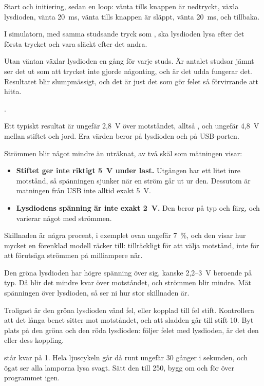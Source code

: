 Start och initiering, sedan en loop: vänta tills knappen är nedtryckt, växla lysdioden, vänta
20~ms, vänta tills knappen är släppt, vänta 20~ms, och tillbaka.

I simulatorn, med samma studsande tryck som , ska lysdioden lysa
efter det första trycket och vara släckt efter det andra.

Utan väntan växlar lysdioden en gång för varje studs. Är antalet studsar jämnt ser det ut som
att trycket inte gjorde någonting, och är det udda fungerar det. Resultatet blir slumpmässigt, och
det är just det som gör felet så förvirrande att hitta.

.

Ett typiskt resultat är ungefär 2,8~V över motståndet, alltså , och
ungefär 4,8~V mellan stiftet och jord. Era värden beror på lysdioden och på USB-porten.

Strömmen blir något mindre än uträknat, av två skäl som mätningen visar:
\begin{itemize}
  \item \textbf{Stiftet ger inte riktigt 5~V under last.} Utgången har ett litet inre motstånd, så
    spänningen sjunker när en ström går ut ur den. Dessutom är matningen från USB inte alltid
    exakt 5~V.
  \item \textbf{Lysdiodens spänning är inte exakt 2~V.} Den beror på typ och färg, och varierar
    något med strömmen.
\end{itemize}
Skillnaden är några procent, i exemplet ovan ungefär 7~\%, och den visar hur mycket en förenklad
modell räcker till: tillräckligt för att välja motstånd, inte för att förutsäga strömmen på
milliampere när.

Den gröna lysdioden har högre spänning över sig, kanske 2,2--3~V beroende på typ. Då blir det
mindre kvar över motståndet, och strömmen blir mindre. Mät spänningen över lysdioden, så ser ni hur
stor skillnaden är.

Troligast är den gröna lysdioden vänd fel, eller kopplad till fel stift. Kontrollera att det
långa benet sitter mot motståndet, och att sladden går till stift 10. Byt plats på den gröna och
den röda lysdioden: följer felet med lysdioden, är det den eller dess koppling.

 står kvar på 1. Hela ljuscykeln går då runt ungefär 30 gånger i sekunden,
och ögat ser alla lamporna lysa svagt. Sätt den till 250, bygg om och för över programmet igen.

